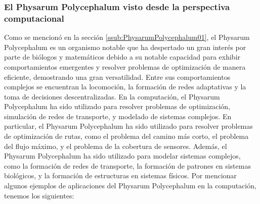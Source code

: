 \subsubsection{El Physarum Polycephalum visto desde la perspectiva computacional}
    Como se mencion\'o en la secci\'on \ref{ssub:PhysarumPolycephalum01}, el Physarum Polycephalum es un organismo notable 
        que ha despertado un gran inter\'es por parte de bi\'ologos y matem\'aticos debido a su notable capacidad para exhibir comportamientos 
        emergentes y resolver problemas de optimizaci\'on de manera eficiente, demostrando una gran versatilidad. Entre sus comportamientos 
        complejos se encuentran la locomoci\'on, la formaci\'on de redes adaptativas y la toma de decisiones descentralizadas.
    \vskip 0.5cm
    En la computaci\'on, el Physarum Polycephalum ha sido utilizado para resolver problemas de optimizaci\'on, 
        simulaci\'on de redes de transporte, y modelado de sistemas complejos. En particular, el Physarum Polycephalum
        ha sido utilizado para resolver problemas de optimizaci\'on de rutas, como el problema del camino m\'as corto,
        el problema del flujo m\'aximo, y el problema de la cobertura de sensores. Adem\'as, el Physarum Polycephalum
        ha sido utilizado para modelar sistemas complejos, como la formaci\'on de redes de transporte, la formaci\'on
        de patrones en sistemas biol\'ogicos, y la formaci\'on de estructuras en sistemas f\'isicos.
    \vskip 0.5cm
    Por mencionar algunos ejemplos de aplicaciones del Physarum Polycephalum en la computaci\'on, tenemos los siguientes:
